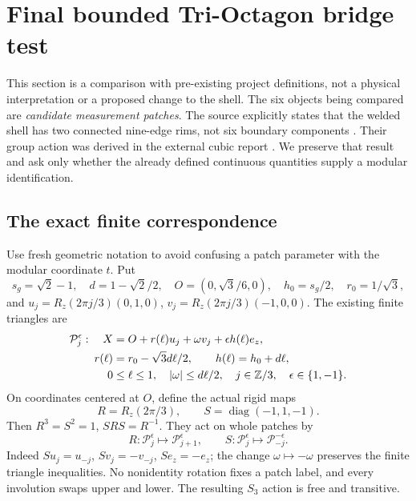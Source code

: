 \section{Final bounded Tri-Octagon bridge test}\label{sec:bridge}
This section is a comparison with pre-existing project definitions, not a physical interpretation or a proposed change to the shell. The six objects being compared are \emph{candidate measurement patches}. The source explicitly states that the welded shell has two connected nine-edge rims, not six boundary components \cite[§§1--2]{patch}. Their group action was derived in the external cubic report \cite[§12]{cubic}. We preserve that result and ask only whether the already defined continuous quantities supply a modular identification.

\subsection{The exact finite correspondence}
Use fresh geometric notation to avoid confusing a patch parameter with the modular coordinate \(t\). Put
\begin{equation}\label{eq:patch_constants}
 s_g=\sqrt2-1,\quad d=1-\sqrt2/2,\quad
 O=(0,\sqrt3/6,0),\quad h_0=s_g/2,\quad r_0=1/\sqrt3,
\end{equation}
and \(u_j=R_z(2\pi j/3)(0,1,0)\), \(v_j=R_z(2\pi j/3)(-1,0,0)\). The existing finite triangles are
\begin{equation}\label{eq:patches}
 \begin{split}
 \mathcal P_j^\epsilon:\quad
 X&=O+r(\ell)u_j+\omega v_j+\epsilon h(\ell)e_z,\\
 r(\ell)&=r_0-\sqrt3d\ell/2,\qquad h(\ell)=h_0+d\ell,\\
 0&\le\ell\le1,\quad |\omega|\le d\ell/2,
 \quad j\in\mathbb Z/3,\quad\epsilon\in\{1,-1\}.
 \end{split}
\end{equation}
On coordinates centered at \(O\), define the actual rigid maps
\begin{equation}\label{eq:patch_group}
 R=R_z(2\pi/3),\qquad S=\operatorname{diag}(-1,1,-1).
\end{equation}
Then \(R^3=S^2=1\), \(SRS=R^{-1}\). They act on whole patches by
\begin{equation}\label{eq:patch_action}
 R:\mathcal P_j^\epsilon\mapsto\mathcal P_{j+1}^\epsilon,
 \qquad S:\mathcal P_j^\epsilon\mapsto\mathcal P_{-j}^{-\epsilon}.
\end{equation}
Indeed \(Su_j=u_{-j}\), \(Sv_j=-v_{-j}\), \(Se_z=-e_z\); the change \(\omega\mapsto-\omega\) preserves the finite triangle inequalities. No nonidentity rotation fixes a patch label, and every involution swaps upper and lower. The resulting \(S_3\) action is free and transitive.

